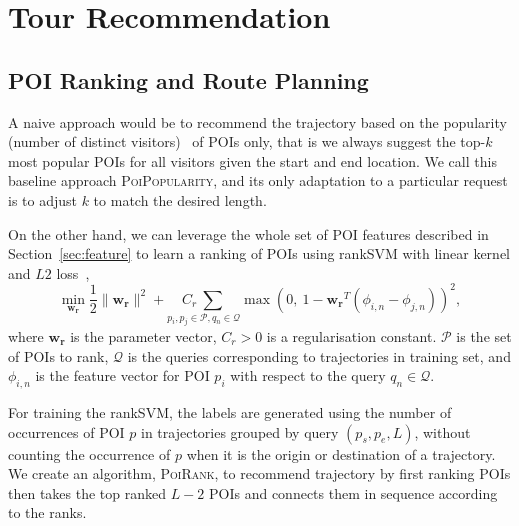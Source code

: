 \section{Tour Recommendation}
\label{sec:recommendation}


\subsection{POI Ranking and Route Planning}
\label{sec:rankplan}

A naive approach would be to recommend the trajectory based on the popularity (number of distinct visitors)~\cite{ht10} of POIs only,
that is we always suggest the top-$k$ most popular POIs for all visitors given the start and end location.
We call this baseline approach \textsc{PoiPopularity},
and its only adaptation to a particular request is to adjust $k$ to match the desired length.

On the other hand, we can leverage the whole set of POI features described in Section~\ref{sec:feature}
to learn a ranking of POIs using rankSVM with linear kernel and $L2$ loss~\cite{lranksvm},
\begin{equation*}
\min_{\mathbf{w_r}} \frac{1}{2} 
                     \|\mathbf{w_r}\|^2 + 
                    \underset{p_i, p_j \in \mathcal{P}, q_n \in \mathcal{Q}}{C_r ~\sum}
                    \max \left( 0,~ 1 - \mathbf{w_r}^T (\phi_{i,n} - \phi_{j,n}) \right)^2,
\end{equation*}
where $\mathbf{w_r}$ is the parameter vector,
$C_r > 0$ is a regularisation constant.
$\mathcal{P}$ is the set of POIs to rank,
$\mathcal{Q}$ is the queries corresponding to trajectories in training set,
and $\phi_{i,n}$ is the feature vector for POI $p_i$ with respect to the query $q_n \in \mathcal{Q}$.

For training the rankSVM, the labels are generated using the number of occurrences of
POI $p$ in trajectories grouped by query $(p_s, p_e, L)$,
without counting the occurrence of $p$ when it is the origin or destination of a trajectory.
We create an algorithm, \textsc{PoiRank}, to recommend trajectory by first ranking POIs 
then takes the top ranked $L-2$ POIs and connects them in sequence according to the ranks.



